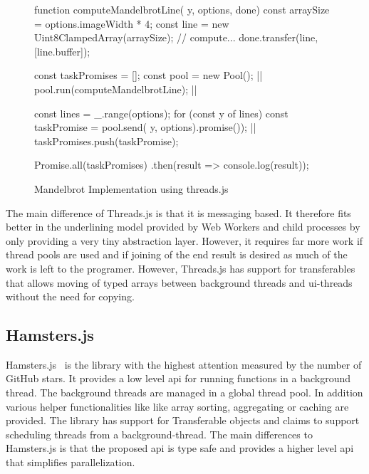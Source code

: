 \begin{figure}
	\begin{javascriptcode}
function computeMandelbrotLine({ y, options}, done) {
	const arraySize = options.imageWidth * 4;
    const line = new Uint8ClampedArray(arraySize);
    // compute...
    done.transfer(line, [line.buffer]);
}

const taskPromises = [];
const pool = new Pool(); |$\label{code:threadsjs-pool}$|
pool.run(computeMandelbrotLine); |$\label{code:threadsjs-worker}$|

const lines = _.range(options);
for (const y of lines) {
	const taskPromise = pool.send({ y, options}).promise()); |$\label{code:threadsjs-messaging}$|
	taskPromises.push(taskPromise);
}

Promise.all(taskPromises)
	.then(result => console.log(result));	
\end{javascriptcode}
\caption{Mandelbrot Implementation using threads.js}
\label{fig:mandelbrot-threadsjs}
\end{figure}

The main difference of Threads.js is that it is messaging based. It therefore fits better in the underlining model provided by Web Workers and child processes by only providing a very tiny abstraction layer. However, it requires far more work if thread pools are used and if joining of the end result is desired as much of the work is left to the programer. However, Threads.js has support for transferables~\cite[Section 2.7.4]{w3cHtml5} that allows moving of typed arrays between background threads and ui-threads without the need for copying. 


\subsection{Hamsters.js}
Hamsters.js~\cite{hamstersjs} is the library with the highest attention measured by the number of GitHub stars. It provides a low level api for running functions in a background thread. The background threads are managed in a global thread pool. In addition various helper functionalities like like array sorting, aggregating or caching are provided. The library has support for Transferable objects and claims to support scheduling threads from a background-thread. The main differences to Hamsters.js is that the proposed api is type safe and provides a higher level api that simplifies parallelization. 

